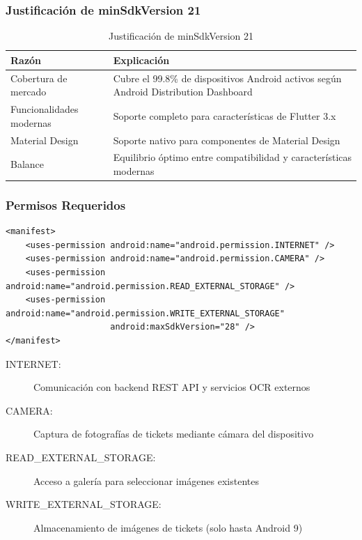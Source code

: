 \subsubsection{Justificación de minSdkVersion 21}

\begin{table}[H]
\centering
\begin{tabularx}{\textwidth}{|l|X|}
\hline
\textbf{Razón} & \textbf{Explicación} \\
\hline
Cobertura de mercado & Cubre el 99.8\% de dispositivos Android activos según Android Distribution Dashboard \cite{android_distribution} \\
\hline
Funcionalidades modernas & Soporte completo para características de Flutter 3.x \\
\hline
Material Design & Soporte nativo para componentes de Material Design \\
\hline
Balance & Equilibrio óptimo entre compatibilidad y características modernas \\
\hline
\end{tabularx}
\caption{Justificación de minSdkVersion 21}
\end{table}

\subsubsection{Permisos Requeridos}

\begin{lstlisting}[caption=Permisos en AndroidManifest.xml]
<manifest>
    <uses-permission android:name="android.permission.INTERNET" />
    <uses-permission android:name="android.permission.CAMERA" />
    <uses-permission android:name="android.permission.READ_EXTERNAL_STORAGE" />
    <uses-permission android:name="android.permission.WRITE_EXTERNAL_STORAGE"
                     android:maxSdkVersion="28" />
</manifest>
\end{lstlisting}

\begin{description}
    \item[INTERNET:] Comunicación con backend REST API y servicios OCR externos
    \item[CAMERA:] Captura de fotografías de tickets mediante cámara del dispositivo
    \item[READ\_EXTERNAL\_STORAGE:] Acceso a galería para seleccionar imágenes existentes
    \item[WRITE\_EXTERNAL\_STORAGE:] Almacenamiento de imágenes de tickets (solo hasta Android 9)
\end{description}

